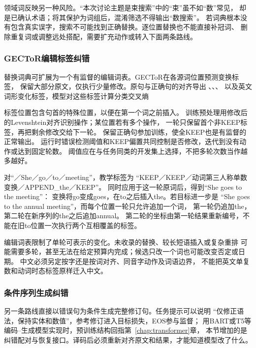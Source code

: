 领域词反映另一种风险。“本次讨论主题是束搜索”中的“束”虽不如“数”常见，
却是已确认术语；将其保护为词组后，混淆筛选不得输出“数搜索”。
若词典根本没有包含真实误字，搜索不可能找到正确替换。逐位置替换也不能直接补冠词、
删除重复词或调整远处搭配，需要扩充动作或转入下面两条路线。

\subsubsection{GECToR编辑标签纠错}
\label{sec:nlp-generation-gector}

替换词典可扩展为一个有监督的编辑词表。GECToR在各源词位置预测变换标签，
保留大部分原文，仅执行少量修改。原句与正确句的对齐导出
、、、
以及英文词形变化标签，模型对这些标签计算分类交叉熵

标签位置包含句首的特殊位置，以便在第一个词之前插入。
训练预处理用修改后的Levenshtein对齐识别操作；某位置若有多个操作，
一轮只保留首个非KEEP标签，再把剩余修改交给下一轮。
保留正确句参加训练，使全KEEP也是有监督的正常输出。
运行时错误检测阈值和KEEP偏置共同控制是否修改，迭代到没有动作或达到固定轮数。
阈值应在与任务同类的开发集上选择，不把多轮次数当作越多越好。

对“／She／go／to／meeting”，教学标签为
“KEEP／KEEP／动词第三人称单数变换／APPEND\_the／KEEP”。
同时应用于这一轮原词后，得到“She goes to the meeting”：
变换将go变成goes，在to之后插入the。若目标进一步是
“She goes to the annual meeting”，而每个位置一轮只允许追加一个词，
第一轮仍追加the，第二轮在新序列的the之后追加annual。
第二轮的坐标由第一轮结果重新编号，不能在旧to位置一次执行两个互相覆盖的标签。

编辑词表限制了单轮可表示的变化。未收录的替换、较长短语插入或复杂重排
可能需要多轮，甚至无法在给定预算内完成；候选只改一个词也可能改变否定或日期。
中文必须另定按字还是按词对齐、同音字动作及词语边界，
不能把英文单复数和动词时态标签原样迁入中文。

\subsubsection{条件序列生成纠错}
\label{sec:nlp-generation-seq-correction}

另一条路线直接以错误句为条件生成完整修订句。任务提示可以说明
“仅修正语法，保持实体和数值”，参考修订进入目标损失，EOS参与监督；
用BART或T5等编码--生成模型实现时，预训练结构回指第~\ref{chap:transformer}章，
本节增加的是纠错配对与恢复接口。译码后必须重新对齐原文和结果，才能知道模型改了什么。

